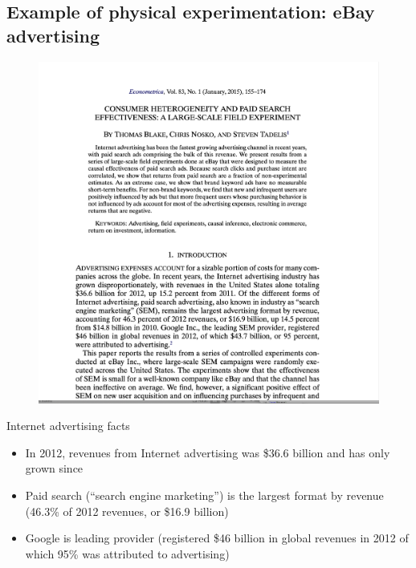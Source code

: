 \documentclass{beamer}
\begin{document}
\subsection{Example of physical experimentation: eBay advertising}

\begin{frame}

  \begin{figure}[hpt]
    \begin{center}
      \includegraphics[scale=0.25]{./lecture_includes/econometrica_steve.png}
    \end{center}
  \end{figure}

\end{frame}

\begin{frame}{Internet advertising facts}

  \begin{itemize}
    \item In 2012, revenues from Internet advertising was \$36.6 billion and has only grown since
    \item Paid search (``search engine marketing'') is the largest format by revenue (46.3\% of 2012 revenues, or \$16.9 billion)
    \item Google is leading provider (registered \$46 billion in global revenues in 2012 of which 95\% was attributed to advertising)
  \end{itemize}

\end{frame}
\end{document}
